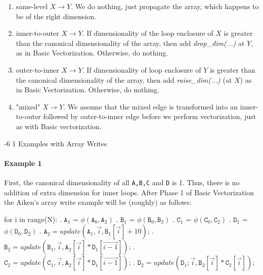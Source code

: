 \documentclass[sigconf, screen, natbib=false, dvipsnames, table]{acmart}
\makeatletter
\renewcommand{\subsubsection}{\@startsection{subsubsection}{3}{\z@}%
                        {-6\p@ \@plus -4\p@ \@minus -4\p@}%
                        {1\p@ \@plus 1\p@ \@minus 0\p@}%
                        {\normalfont\normalsize\bfseries\boldmath}}
\theoremstyle{definition}
\makeatother
\begin{document}
\begin{enumerate}

\item same-level $X \rightarrow Y$. We do nothing, just propagate the array, which happens to be of the right dimension. 

\item inner-to-outer $X \rightarrow Y$. If dimensionality of the loop enclosure of $X$ is greater than the canonical dimensionality of the array, then add \emph{drop\_dim(...)} at $Y$, as in Basic Vectorization. Otherwise, do nothing.

\item outer-to-inner $X \rightarrow Y$. If dimensionality of loop enclosure of $Y$ is greater than the canonical dimensionality of the array, then add \emph{raise\_dim(...)} (at $X$) as in Basic Vectorization. Otherwise, do nothing.

\item "mixed" $X \rightarrow Y$. We assume that the mixed edge is transformed into an inner-to-outer followed by outer-to-inner edge before we perform vectorization, just as with Basic vectorization.

\end{enumerate}

\subsubsection{Examples with Array Writes}

\paragraph{Example 1}

First, the canonical dimensionality of all \texttt{A,B,C} and \texttt{D} is 1. 
Thus, there is no addition of extra dimension for inner loops. After Phase 1 
of Basic Vectorization the Aiken's array write example will be (roughly) as follows:

\begin{algorithmic}
\STATE for i in range(N):
. $\texttt{A}_1$ = $\phi(\texttt{A}_0,\texttt{A}_2)$
. $\texttt{B}_1$ = $\phi(\texttt{B}_0,\texttt{B}_2)$
. $\texttt{C}_1$ = $\phi(\texttt{C}_0,\texttt{C}_2)$
. $\texttt{D}_1$ = $\phi(\texttt{D}_0,\texttt{D}_2)$
. $\texttt{A}_2 = update(\texttt{A}_1, \stackrel{\rightarrow}{i}, \texttt{B}_1[\stackrel{\rightarrow}{i}] + 10)$;
. $\texttt{B}_2 = update(\texttt{B}_1, \stackrel{\rightarrow}{i}, \texttt{A}_2[\stackrel{\rightarrow}{i}] * \texttt{D}_1[\stackrel{\rightarrow}{i-1}])$;
. $\texttt{C}_2 = update(\texttt{C}_1, \stackrel{\rightarrow}{i}, \texttt{A}_2[\stackrel{\rightarrow}{i}] * \texttt{D}_1[\stackrel{\rightarrow}{i-1}])$;
. $\texttt{D}_2 = update(\texttt{D}_1; \stackrel{\rightarrow}{i}, \texttt{B}_2[\stackrel{\rightarrow}{i}] * \texttt{C}_2[\stackrel{\rightarrow}{i}])$;
\end{algorithmic}
\end{document}
